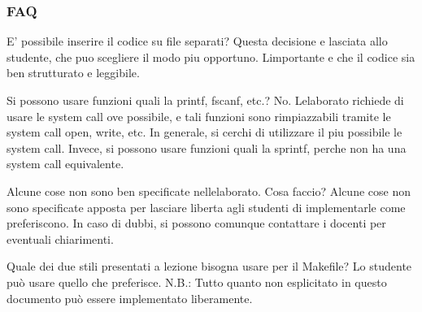\subsubsection*{F\+AQ}


\begin{DoxyEnumerate}
\item E’ possibile inserire il codice su file separati? Questa decisione e\textquotesingle{} lasciata allo studente, che puo\textquotesingle{} scegliere il modo piu\textquotesingle{} opportuno. L\textquotesingle{}importante e\textquotesingle{} che il codice sia ben strutturato e leggibile.
\item Si possono usare funzioni quali la printf, fscanf, etc.? No. L\textquotesingle{}elaborato richiede di usare le system call ove possibile, e tali funzioni sono rimpiazzabili tramite le system call open, write, etc. In generale, si cerchi di utilizzare il piu\textquotesingle{} possibile le system call. Invece, si possono usare funzioni quali la sprintf, perche\textquotesingle{} non ha una system call equivalente.
\item Alcune cose non sono ben specificate nell\textquotesingle{}elaborato. Cosa faccio? Alcune cose non sono specificate apposta per lasciare liberta\textquotesingle{} agli studenti di implementarle come preferiscono. In caso di dubbi, si possono comunque contattare i docenti per eventuali chiarimenti.
\item Quale dei due stili presentati a lezione bisogna usare per il Makefile? Lo studente può usare quello che preferisce. N.\+B.\+: Tutto quanto non esplicitato in questo documento può essere implementato liberamente. 
\end{DoxyEnumerate}